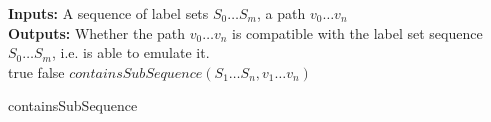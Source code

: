 \begin{algorithm}
\color{purple}
\SetAlgoLined
\LinesNumbered
\textbf{Inputs: } A sequence of label sets $S_0 \dots S_m$, a path $v_0 \dots v_n$\\
\textbf{Outputs: } Whether the path $v_0 \dots v_n$ is compatible with the label set sequence $S_0 \dots S_m$, i.e. is able to emulate it.\\
  {
	\Return true\;
}  {
	\Return false\;
}  {
	\Return $\mathit{containsSubSequence}(S_1 \dots S_n, v_1 \dots v_n)$\;
} 
 \caption{containsSubSequence}
 \label{algorithm:containsSubSequence}
\end{algorithm}
